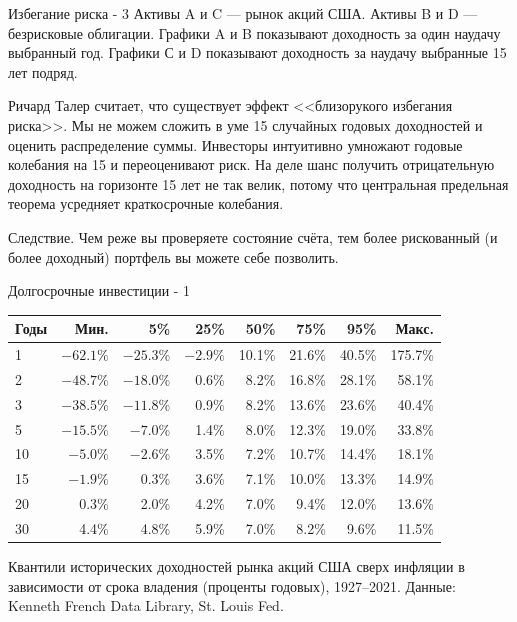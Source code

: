 \documentclass{beamer}
\begin{document}
\begin{frame}{Избегание риска - 3}
\justify
Активы A и C --- рынок акций США. Активы B и D --- безрисковые облигации. 
Графики A и B показывают доходность за один наудачу выбранный год. Графики С и 
D показывают доходность за наудачу выбранные 15 лет подряд.

\justify
Ричард Талер считает, что существует эффект <<близорукого избегания риска>>. Мы 
не можем сложить в уме 15 случайных годовых доходностей и оценить распределение 
суммы. Инвесторы интуитивно умножают годовые колебания на 15 и переоценивают 
риск. На деле шанс получить отрицательную доходность на горизонте 15 лет не так 
велик, потому что центральная предельная теорема усредняет краткосрочные 
колебания.

\justify
Следствие. Чем реже вы проверяете состояние счёта, тем более рискованный (и 
более доходный) портфель вы можете себе позволить.
\end{frame}



\begin{frame}{Долгосрочные инвестиции - 1}
\centering
\footnotesize
\begin{tabular}{l|r|r|r|r|r|r|r}
Годы & Мин.      &       5\% &   25\%   &   50\% &   75\% &   95\% & Макс. \\ \hline
1    & $-62.1\%$ & $-25.3\%$ & $-2.9\%$ & 10.1\% & 21.6\% & 40.5\% & 175.7\% \\
2    & $-48.7\%$ & $-18.0\%$ &  0.6\%   &  8.2\% & 16.8\% & 28.1\% &  58.1\% \\
3    & $-38.5\%$ & $-11.8\%$ &  0.9\%   &  8.2\% & 13.6\% & 23.6\% &  40.4\% \\ 
5    & $-15.5\%$ &  $-7.0\%$ &  1.4\%   &  8.0\% & 12.3\% & 19.0\% &  33.8\% \\
10   & $ -5.0\%$ &  $-2.6\%$ &  3.5\%   &  7.2\% & 10.7\% & 14.4\% &  18.1\% \\
15   &  $-1.9\%$ &    0.3\%  &  3.6\%   &  7.1\% & 10.0\% & 13.3\% &  14.9\% \\
20   &    0.3\%  &    2.0\%  &  4.2\%   &  7.0\% &  9.4\% & 12.0\% &  13.6\% \\
30   &    4.4\%  &    4.8\%  &  5.9\%   &  7.0\% &  8.2\% &  9.6\% &  11.5\% 
\end{tabular}

\justify
Квантили исторических доходностей рынка акций США сверх инфляции в зависимости 
от срока владения (проценты годовых), 1927--2021. Данные: Kenneth French Data 
Library, St. Louis  Fed.
\end{frame}
\end{document}
